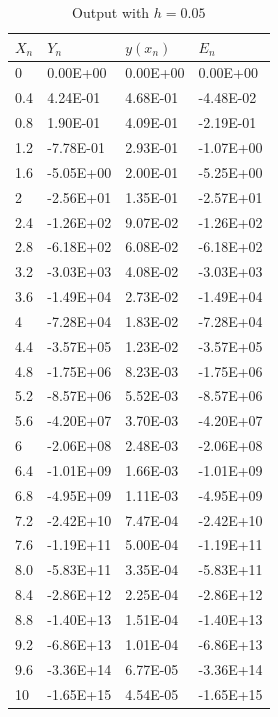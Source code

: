 \documentclass[10pt,a4paper]{report}
\begin{document}
\begin{table}[H]
\centering
\begin{tabular}{|l|l|l|l|}
\hline
$X_n$ & $Y_n$      & $y(x_n)$  & $E_n$      \\ \hline
0        & 0.00E+00  & 0.00E+00 & 0.00E+00  \\ \hline
0.4      & 4.24E-01  & 4.68E-01 & -4.48E-02 \\ \hline
0.8      & 1.90E-01  & 4.09E-01 & -2.19E-01 \\ \hline
1.2      & -7.78E-01 & 2.93E-01 & -1.07E+00 \\ \hline
1.6      & -5.05E+00 & 2.00E-01 & -5.25E+00 \\ \hline
2        & -2.56E+01 & 1.35E-01 & -2.57E+01 \\ \hline
2.4      & -1.26E+02 & 9.07E-02 & -1.26E+02 \\ \hline
2.8      & -6.18E+02 & 6.08E-02 & -6.18E+02 \\ \hline
3.2      & -3.03E+03 & 4.08E-02 & -3.03E+03 \\ \hline
3.6      & -1.49E+04 & 2.73E-02 & -1.49E+04 \\ \hline
4        & -7.28E+04 & 1.83E-02 & -7.28E+04 \\ \hline
4.4      & -3.57E+05 & 1.23E-02 & -3.57E+05 \\ \hline
4.8      & -1.75E+06 & 8.23E-03 & -1.75E+06 \\ \hline
5.2      & -8.57E+06 & 5.52E-03 & -8.57E+06 \\ \hline
5.6      & -4.20E+07 & 3.70E-03 & -4.20E+07 \\ \hline
6        & -2.06E+08 & 2.48E-03 & -2.06E+08 \\ \hline
6.4      & -1.01E+09 & 1.66E-03 & -1.01E+09 \\ \hline
6.8 & -4.95E+09 & 1.11E-03 & -4.95E+09 \\ \hline
7.2 & -2.42E+10 & 7.47E-04 & -2.42E+10 \\ \hline
7.6 & -1.19E+11 & 5.00E-04 & -1.19E+11 \\ \hline
8.0 & -5.83E+11 & 3.35E-04 & -5.83E+11 \\ \hline
8.4 & -2.86E+12 & 2.25E-04 & -2.86E+12 \\ \hline
8.8 & -1.40E+13 & 1.51E-04 & -1.40E+13 \\ \hline
9.2 & -6.86E+13 & 1.01E-04 & -6.86E+13 \\ \hline
9.6 & -3.36E+14 & 6.77E-05 & -3.36E+14 \\ \hline
10 & -1.65E+15 & 4.54E-05 & -1.65E+15 \\ \hline
\end{tabular}
\caption{Output with $h=0.05$}
\end{table}
\end{document}
